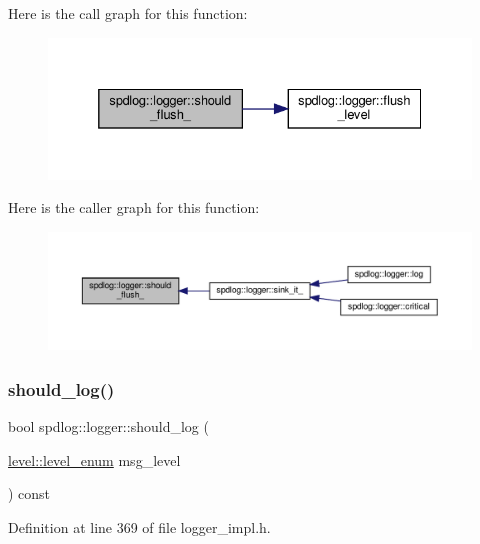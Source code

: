 Here is the call graph for this function\+:
\nopagebreak
\begin{figure}[H]
\begin{center}
\leavevmode
\includegraphics[width=332pt]{classspdlog_1_1logger_aa1bbe703cdeed2aef722a97a2bc1a800_cgraph}
\end{center}
\end{figure}
Here is the caller graph for this function\+:
\nopagebreak
\begin{figure}[H]
\begin{center}
\leavevmode
\includegraphics[width=350pt]{classspdlog_1_1logger_aa1bbe703cdeed2aef722a97a2bc1a800_icgraph}
\end{center}
\end{figure}
\mbox{\label{classspdlog_1_1logger_a94c77395570c462953ded4188aaaf655}} 
\subsubsection{\texorpdfstring{should\+\_\+log()}{should\_log()}}
{\footnotesize\ttfamily bool spdlog\+::logger\+::should\+\_\+log (\begin{DoxyParamCaption}\item[{\hyperlink{namespacespdlog_1_1level_a35f5227e5daf228d28a207b7b2aefc8b}{level\+::level\+\_\+enum}}]{msg\+\_\+level }\end{DoxyParamCaption}) const\hspace{0.3cm}{\ttfamily [inline]}}



Definition at line 369 of file logger\+\_\+impl.\+h.

